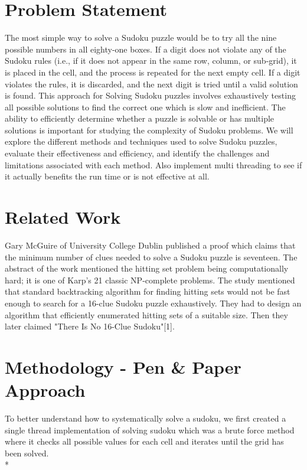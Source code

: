 \documentclass[conference]{IEEEtran}
\begin{document}
\section{Problem Statement}
The most simple way to solve a Sudoku puzzle would be to try all the nine possible numbers in all eighty-one boxes. If a digit does not violate any of the Sudoku rules (i.e., if it does not appear in the same row, column, or sub-grid), it is placed in the cell, and the process is repeated for the next empty cell. If a digit violates the rules, it is discarded, and the next digit is tried until a valid solution is found. This approach for Solving Sudoku puzzles involves exhaustively testing all possible solutions to find the correct one which is slow and inefficient. The ability to efficiently determine whether a puzzle is solvable or has multiple solutions is important for studying the complexity of Sudoku problems. We will explore the different methods and techniques used to solve Sudoku puzzles, evaluate their effectiveness and efficiency, and identify the challenges and limitations associated with each method. Also implement multi threading to see if it actually benefits the run time or is not effective at all.

\section{Related Work}
Gary McGuire of University College Dublin published a proof which claims that the minimum number of clues needed to solve a Sudoku puzzle is seventeen. The abstract of the work mentioned the hitting set problem being computationally hard; it is one of Karp’s 21 classic NP-complete problems. The study mentioned that standard backtracking algorithm for finding hitting sets would not be fast enough to search for a 16-clue Sudoku puzzle exhaustively. They had to design an algorithm that efficiently enumerated hitting sets of a suitable size. Then they later claimed "There Is No 16-Clue Sudoku"[1].


\section{Methodology - Pen \& Paper Approach}
To better understand how to systematically solve a sudoku, we first created a single thread implementation of solving sudoku
which was a brute force method where it checks all possible values for each cell and iterates until the grid has been solved.
\\*
\end{document}
